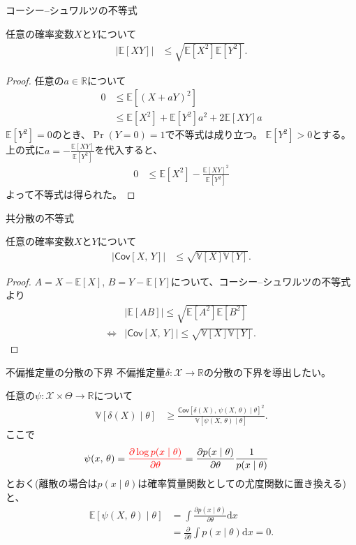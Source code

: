 \documentclass[lualatex,handout]{beamer}
\newcommand{\mycolor}[2]{%
  \begingroup
  \colorlet{currentcolor}{.}%
  \color{#1}#2%
  \color{currentcolor}%
  \endgroup
}
\newcommand{\emm}[1]{\mycolor{red}{#1}}
\newcommand{\expt}[1]{\mathbb{E}\left[#1\right]}
\newcommand{\var}[1]{\mathbb{V}\left[#1\right]}
\newcommand{\cov}[1]{\mathsf{Cov}\left[#1\right]}
\theoremstyle{definition}
\begin{document}
\begin{frame}{コーシー--シュワルツの不等式}
\small
\begin{lemma}
任意の確率変数$X$と$Y$について
\begin{align*}
|\expt{XY}|&\le\sqrt{\expt{X^2}\expt{Y^2}}.
\end{align*}
\end{lemma}
\begin{proof}
任意の$a\in\mathbb{R}$について
\begin{align*}
0&\le\expt{(X+aY)^2}\\
&\le\expt{X^2}+\expt{Y^2}a^2+2\expt{XY}a
\end{align*}
$\expt{Y^2}=0$のとき、$\Pr(Y=0)=1$で不等式は成り立つ。
$\expt{Y^2}>0$とする。
上の式に$a=-\frac{\expt{XY}}{\expt{Y^2}}$を代入すると、
\begin{align*}
0&\le \expt{X^2} - \frac{\expt{XY}^2}{\expt{Y^2}}
\end{align*}
よって不等式は得られた。
\end{proof}
\end{frame}

\begin{frame}{共分散の不等式}
\small
\begin{corollary}
任意の確率変数$X$と$Y$について
\begin{align*}
|\cov{X,\,Y}|&\le\sqrt{\var{X}\var{Y}}.
\end{align*}
\end{corollary}
\begin{proof}
$A= X - \expt{X}$,
$B= Y - \expt{Y}$について、コーシー--シュワルツの不等式より
\begin{align*}
&|\expt{AB}|\le\sqrt{\expt{A^2}\expt{B^2}}\\
\iff&|\cov{X,\,Y}|\le\sqrt{\var{X}\var{Y}}.
\end{align*}
\end{proof}
\end{frame}

\begin{frame}{不偏推定量の分散の下界}
不偏推定量$\delta\colon\mathcal{X}\to\mathbb{R}$の分散の下界を導出したい。

\vspace{1em}
任意の$\psi\colon\mathcal{X}\times\Theta\to\mathbb{R}$について
\begin{align*}
\var{\delta(X)\mid\theta}&\ge\frac{\cov{\delta(X),\,\psi(X,\,\theta)\mid\theta}^2}{\var{\psi(X,\,\theta)\mid\theta}}.
\end{align*}
ここで
\begin{align*}
\psi(x,\,\theta)&
=\emm{\frac{\partial\log p(x\mid\theta)}{\partial\theta}}
=\frac{\partial p(x\mid\theta)}{\partial\theta}\frac1{p(x\mid\theta)}
\end{align*}
とおく(離散の場合は$p(x\mid\theta)$は確率質量関数としての尤度関数に置き換える)と、
\begin{align*}
\expt{\psi(X,\,\theta)\mid\theta}&= \int \frac{\partial p(x\mid\theta)}{\partial\theta}\mathrm{d}x\\
&= \frac{\partial }{\partial\theta}\int p(x\mid\theta)\mathrm{d}x=0.
\end{align*}
\end{frame}
\end{document}
